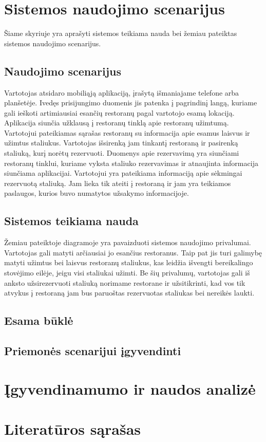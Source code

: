 \documentclass{VUMIFPSkursinis}
\begin{document}
\section{Sistemos naudojimo scenarijus}

Šiame skyriuje yra aprašyti sistemos teikiama nauda bei žemiau pateiktas sistemos naudojimo scenarijus.

\subsection{Naudojimo scenarijus}

Vartotojas atsidaro mobiliąją aplikaciją, įrašytą išmaniajame telefone arba planšetėje. Ivedęs prisijungimo duomenis jis patenka į pagrindinį langą, kuriame gali ieškoti artimiausiai esančių restoranų pagal vartotojo esamą lokaciją. Aplikacija siunčia užklausą į restoranų tinklą apie restoranų užimtumą. Vartotojui pateikiamas sąrašas restoranų su informacija apie esamus laisvus ir užimtus staliukus. Vartotojas išsirenką jam tinkantį restoraną ir pasirenką staliuką, kurį norėtų rezervuoti. Duomenys apie rezervavimą yra siunčiami restoranų tinklui, kuriame vyksta staliuko rezervavimas ir atnaujinta informacija siunčiama aplikacijai. Vartotojui yra pateikiama informaciją apie sėkmingai rezervuotą staliuką. Jam lieka tik ateiti į restoraną ir jam yra teikiamos paslaugos, kurios buvo numatytos užsakymo informacijoje.

\subsection{Sistemos teikiama nauda}

Žemiau pateiktoje diagramoje yra pavaizduoti sistemos naudojimo privalumai.
Vartotojas gali matyti arčiausiai jo esančius restoranus. Taip pat jis turi galimybę matyti užimtus bei laisvus restoranų staliukus, kas leidžia išvengti bereikalingo stovėjimo eilėje, jeigu visi staliukai užimti. Be šių privalumų, vartotojas gali iš anksto užsirezervuoti staliuką norimame restorane ir užsitikrinti, kad vos tik atvykus į restoraną jam bus paruoštas rezervuotas staliukas bei nereikės laukti.

\subsection{Esama būklė}

\subsection{Priemonės scenarijui įgyvendinti}

\section{Įgyvendinamumo ir naudos analizė}

\section{Literatūros sąrašas}
\end{document}
